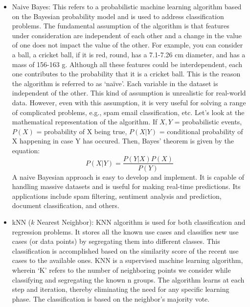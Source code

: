 \documentclass[11pt]{article}
\begin{document}
\begin{itemize}

\item Naive Bayes: This refers to a probabilistic machine learning algorithm based on the Bayesian probability model and is used to address classification problems. The fundamental assumption of the algorithm is that features under consideration are independent of each other and a change in the value of one does not impact the value of the other. For example, you can consider a ball, a cricket ball, if it is red, round, has a 7.1-7.26 cm diameter, and has a mass of 156-163 g. Although all these features could be interdependent, each one contributes to the probability that it is a cricket ball. This is the reason the algorithm is referred to as ‘naïve’. Each variable in the dataset is independent of the other. This kind of assumption is unrealistic for real-world data. However, even with this assumption, it is very useful for solving a range of complicated problems, e.g., spam email classification, etc. Let’s look at the mathematical representation of the algorithm.
If $X, Y$ = probabilistic events, $P(X)$ = probability of X being true, $P(X \vert Y)$ = conditional probability of X happening in case Y has occured. Then, Bayes’ theorem is given by the equation:
\begin{equation}
P(X \vert Y) = \frac{P(Y \vert X) P(X)}{P(Y)}
\end{equation}
A naive Bayesian approach is easy to develop and implement. It is capable of handling massive datasets and is useful for making real-time predictions. 
Its applications include spam filtering, sentiment analysis and prediction, document classification, and others.
\item kNN ($k$ Nearest Neighbor): KNN algorithm is used for both classification and regression problems. It stores all the known use cases and classifies new use cases (or data points) by segregating them into different classes. This classification is accomplished based on the similarity score of the recent use cases to the available ones. KNN is a supervised machine learning algorithm, wherein ‘K’ refers to the number of neighboring points we consider while classifying and segregating the known n groups. The algorithm learns at each step and iteration, thereby eliminating the need for any specific learning phase. The classification is based on the neighbor’s majority vote.

\end{itemize}
\end{document}
